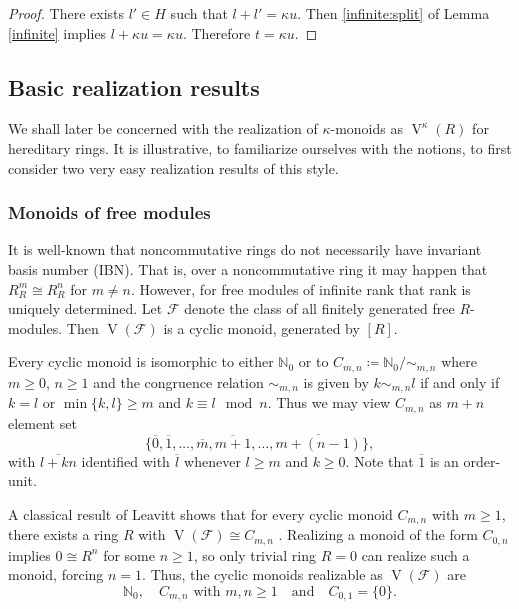 \documentclass[a4paper,11pt,oneside]{amsart}
\theoremstyle{remark}
\newcommand{\bN}{\mathbb N}
\DeclareMathOperator{\Vmon}{V}
\begin{document}
\begin{proof}
  There exists $l' \in H$ such that $l + l' = \kappa u$.
  Then \ref{infinite:split} of Lemma \ref{infinite} implies $l + \kappa u = \kappa u$.
  Therefore $t = \kappa u$.
\end{proof}


\subsection{Basic realization results}

We shall later be concerned with the realization of $\kappa$-monoids as $\Vmon^{\kappa}(R)$ for hereditary rings.
It is illustrative, to familiarize ourselves with the notions, to first consider two very easy realization results of this style.

\subsubsection{Monoids of free modules} \label{ss:free-modules}
It is well-known that noncommutative rings do not necessarily have invariant basis number (IBN).
That is, over a noncommutative ring it may happen that $R_R^m \cong R_R^n$ for $m \ne n$.
However, for free modules of infinite rank that rank is uniquely determined.
Let $\mathcal F$ denote the class of all finitely generated free $R$-modules.
Then $\Vmon(\mathcal F)$ is a cyclic monoid, generated by $[R]$.

Every cyclic monoid is isomorphic to either $\bN_0$ or to $C_{m,n}\coloneqq\bN_0/\!\sim_{m,n}$ where $m \ge 0$, $n \ge 1$ and the congruence relation $\sim_{m,n}$ is given by $k \sim_{m,n} l$ if and only if $k=l$ or $\min\{k,l\} \ge m$ and $k \equiv l \mod n$.
Thus we may view $C_{m,n}$ as $m+n$ element set
\[
   \{ \overline 0, \overline 1, \ldots, \overline m, \overline{m+1}, \dots, \overline{m+(n-1)} \},
 \]
with $\overline{l+kn}$ identified with $\overline{l}$ whenever $l \ge m$ and $k \ge 0$.
Note that $\overline{1}$ is an order-unit.

A classical result of Leavitt shows that for every cyclic monoid $C_{m,n}$ with $m \ge 1$, there exists a ring $R$ with $\Vmon(\mathcal F) \cong C_{m,n}$ \cite{Leavitt62}.
Realizing a monoid of the form $C_{0,n}$ implies $0 \cong R^n$ for some $n \ge 1$, so only trivial ring $R=0$ can realize such a monoid, forcing $n=1$.
Thus, the cyclic monoids realizable as $\Vmon(\mathcal F)$ are
\[
  \bN_0, \quad C_{m,n} \text{ with } m, n \ge 1 \quad \text{and} \quad C_{0,1} = \{0\}.
\]
\end{document}
